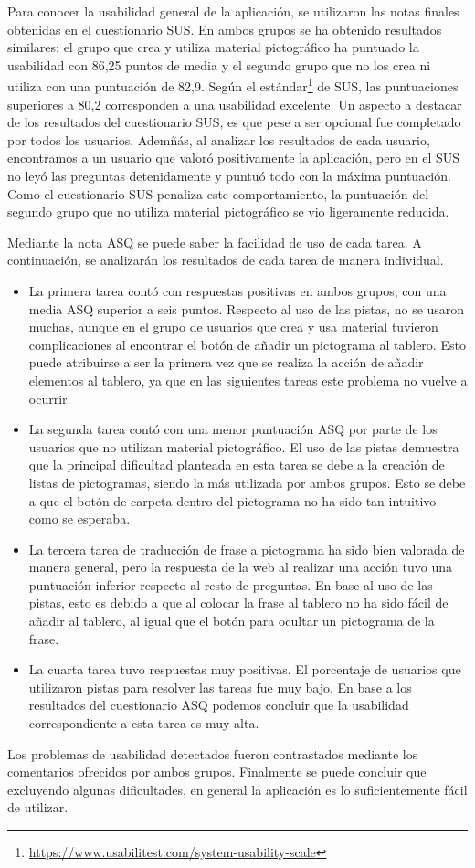 Para conocer la usabilidad general de la aplicación, se utilizaron las notas finales obtenidas en el cuestionario SUS. En ambos grupos se ha obtenido resultados similares: el grupo que crea y utiliza material pictográfico ha puntuado la usabilidad con 86,25 puntos de media y el segundo grupo que no los crea ni utiliza con una puntuación de 82,9. Según el estándar\footnote{\url{https://www.usabilitest.com/system-usability-scale}} de SUS, las puntuaciones superiores a 80,2 corresponden a una usabilidad excelente. 
Un aspecto a destacar de los resultados del cuestionario SUS, es que pese a ser opcional fue completado por todos los usuarios. Ademñás, al analizar los resultados de cada usuario, encontramos a un usuario que valoró positivamente la aplicación, pero en el SUS no leyó las preguntas detenidamente y puntuó todo con la máxima puntuación. Como el cuestionario SUS penaliza este comportamiento, la puntuación del segundo grupo que no utiliza material pictográfico se vio ligeramente reducida. 

Mediante la nota ASQ se puede saber la facilidad de uso de cada tarea. A continuación, se analizarán los resultados de cada tarea de manera individual.

\begin{itemize}
	\item La primera tarea contó con respuestas positivas en ambos grupos, con una media ASQ superior a seis puntos. Respecto al uso de las pistas, no se usaron muchas, aunque en el grupo de usuarios que crea y usa material tuvieron complicaciones al encontrar el botón de añadir un pictograma al tablero. Esto puede atribuirse a ser la primera vez que se realiza la acción de añadir elementos al tablero, ya que en las siguientes tareas este problema no vuelve a ocurrir. 
	
	\item La segunda tarea contó con una menor puntuación ASQ por parte de los usuarios que no utilizan material pictográfico. El uso de las pistas demuestra que la principal dificultad planteada en esta tarea se debe a la creación de listas de pictogramas, siendo la más utilizada por ambos grupos. Esto se debe a que el botón de carpeta dentro del pictograma no ha sido tan intuitivo como se esperaba.
	
	
	\item La tercera tarea de traducción de frase a pictograma ha sido bien valorada de manera general, pero la respuesta de la web al realizar una acción tuvo una puntuación inferior respecto al resto de preguntas. En base al uso de las pistas, esto es debido a que al colocar la frase al tablero no ha sido fácil de añadir al tablero, al igual que el botón para ocultar un pictograma de la frase.
	
	
	\item La cuarta tarea tuvo respuestas muy positivas. El porcentaje de usuarios que utilizaron pistas para resolver las tareas fue muy bajo. En base a los resultados del cuestionario ASQ podemos concluir que la usabilidad correspondiente a esta tarea es muy alta.
\end{itemize}

Los problemas de usabilidad detectados fueron contrastados mediante los comentarios ofrecidos por ambos grupos. Finalmente se puede concluir que excluyendo algunas dificultades, en general la aplicación es lo suficientemente fácil de utilizar.
